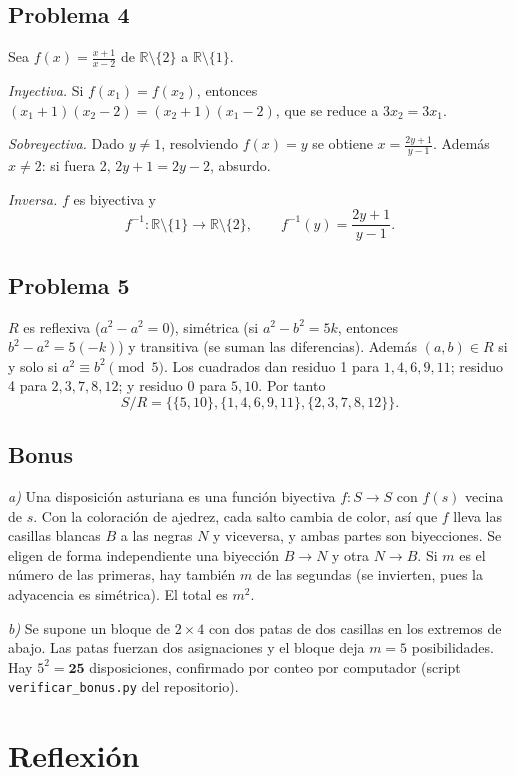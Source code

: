 \documentclass[conference]{IEEEtran}
\newcommand{\R}{\mathbb{R}}
\begin{document}
\subsection{Problema 4}
Sea $f(x)=\frac{x+1}{x-2}$ de $\R\setminus\{2\}$ a $\R\setminus\{1\}$.

\emph{Inyectiva.} Si $f(x_1)=f(x_2)$, entonces $(x_1+1)(x_2-2)=(x_2+1)(x_1-2)$, que se reduce a $3x_2=3x_1$.

\emph{Sobreyectiva.} Dado $y\ne1$, resolviendo $f(x)=y$ se obtiene $x=\frac{2y+1}{y-1}$. Además $x\neq2$: si fuera 2, $2y+1=2y-2$, absurdo.

\emph{Inversa.} $f$ es biyectiva y
\[
f^{-1}:\R\setminus\{1\}\to\R\setminus\{2\},\qquad f^{-1}(y)=\frac{2y+1}{y-1}.
\]

\subsection{Problema 5}
$R$ es reflexiva ($a^2-a^2=0$), simétrica (si $a^2-b^2=5k$, entonces $b^2-a^2=5(-k)$) y transitiva (se suman las diferencias). Además $(a,b)\in R$ si y solo si $a^2\equiv b^2 \pmod 5$. Los cuadrados dan residuo 1 para $1,4,6,9,11$; residuo 4 para $2,3,7,8,12$; y residuo 0 para $5,10$. Por tanto
\[
S/R=\bigl\{\{5,10\},\{1,4,6,9,11\},\{2,3,7,8,12\}\bigr\}.
\]

\subsection{Bonus}
\emph{a)} Una disposición asturiana es una función biyectiva $f:S\to S$ con $f(s)$ vecina de $s$. Con la coloración de ajedrez, cada salto cambia de color, así que $f$ lleva las casillas blancas $B$ a las negras $N$ y viceversa, y ambas partes son biyecciones. Se eligen de forma independiente una biyección $B\to N$ y otra $N\to B$. Si $m$ es el número de las primeras, hay también $m$ de las segundas (se invierten, pues la adyacencia es simétrica). El total es $m^2$.

\emph{b)} Se supone un bloque de $2\times4$ con dos patas de dos casillas en los extremos de abajo. Las patas fuerzan dos asignaciones y el bloque deja $m=5$ posibilidades. Hay $5^2=\mathbf{25}$ disposiciones, confirmado por conteo por computador (script \texttt{verificar\_bonus.py} del repositorio).

\section{Reflexión}
\end{document}
